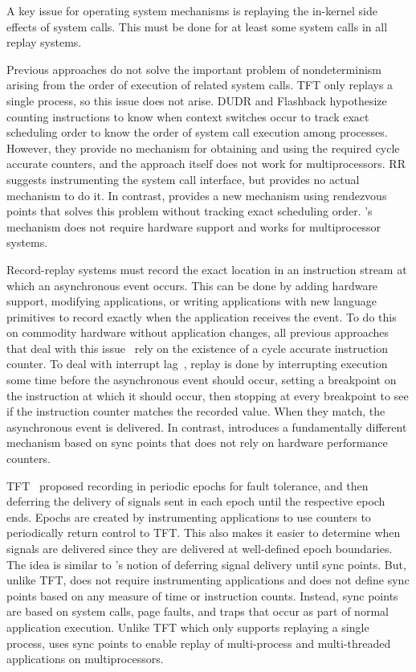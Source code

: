 A key issue for operating system mechanisms is replaying the in-kernel
side effects of system calls.  This must be done for at least some
system calls in all replay systems.  

Previous approaches
do not solve the important problem of nondeterminism arising from
the order of execution of related system calls.  TFT only replays a
single process, so this issue does not arise.  DUDR and Flashback
hypothesize counting instructions to know when context switches occur
to track exact scheduling order to know the order of system call
execution among processes.  However, they provide no mechanism for
obtaining and using the required cycle accurate counters, and the
approach itself does not work for multiprocessors.  RR suggests
instrumenting the system call interface, but provides no actual
mechanism to do it.  In contrast, \scribe{} provides a new mechanism
using rendezvous points that solves this problem without tracking
exact scheduling order.  \scribe{}'s mechanism does not require
hardware support and works for multiprocessor systems. 

Record-replay systems must record the exact location in an instruction
stream at which an asynchronous event occurs.
This can be done by adding hardware support, modifying
applications, or writing applications with new language primitives to
record exactly when the application receives the event.
To do this on commodity hardware without application changes, all
previous approaches that deal with this
issue~\cite{bressoud,revirt,smp-revirt,slye96}
rely on the existence of a cycle accurate instruction counter.
To deal with interrupt lag~\cite{hwcount-isas06}, replay is done by
interrupting execution some time before the asynchronous event should
occur, 
setting a breakpoint on the instruction at which it should
occur, then stopping at every breakpoint to see if the instruction
counter matches the recorded value.  When they match, the asynchronous
event is delivered.
In contrast, \scribe{} introduces a fundamentally
different mechanism based on sync points that does not rely on
hardware performance counters.

TFT~\cite{bressoud-tft} proposed recording in periodic epochs for
fault tolerance, and then deferring the delivery of signals 
sent in each epoch until the respective epoch ends.  Epochs are
created by instrumenting applications to use counters to periodically
return control to TFT.  This also makes it easier to determine when
signals are delivered since they are delivered at well-defined epoch
boundaries.  The idea is similar to \scribe{}'s notion of deferring
signal delivery until sync points.  But, unlike TFT, \scribe{}
does not require instrumenting applications and does not define sync
points based on any measure of time or instruction counts.  Instead,
sync points are based on system calls, page faults, and traps that
occur as part of normal application execution.  Unlike TFT which only
supports replaying a single process, \scribe{} uses sync points to
enable replay of multi-process and multi-threaded applications on
multiprocessors. 

